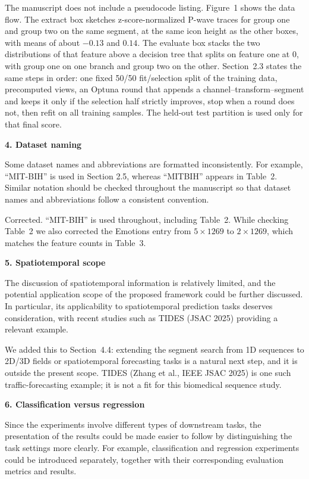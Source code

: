 \documentclass[11pt]{article}
\makeatletter
\newcommand{\rsp}{\par\vspace{0.9em}}
\newcommand{\rcitem}[2]{\begin{reviewerbox}\textbf{#1}\par\smallskip#2\end{reviewerbox}}
\newcommand{\response}[2]{%
  \begin{responsebox}#1%
  \def\@responseitems{#2}%
  \ifx\@responseitems\empty\else\begin{itemize}[nosep,leftmargin=1.2em]#2\end{itemize}\fi
  \end{responsebox}\rsp}
\makeatother
\begin{document}
\response{The manuscript does not include a pseudocode listing. Figure~1 shows the data
flow. The extract box sketches z-score-normalized P-wave traces for group one and group two on the same segment, at the same icon height as the other boxes, with means of about $-0.13$ and $0.14$.
The evaluate box stacks the two distributions of that feature above a decision tree that splits on feature one at $0$, with group one on one branch and group two on the other.
Section~2.3 states the same steps in order: one fixed 50/50 fit/selection split of the training data, precomputed views, an Optuna round that appends a
channel--transform--segment and keeps it only if the selection half strictly improves, stop when a
round does not, then refit on all training samples. The held-out test partition is used only for
that final score.}{}

\rcitem{4. Dataset naming}{Some dataset names and abbreviations are formatted inconsistently. For
example, ``MIT-BIH'' is used in Section 2.5, whereas ``MITBIH'' appears in Table~2. Similar notation
should be checked throughout the manuscript so that dataset names and abbreviations follow a consistent
convention.}

\response{Corrected. ``MIT-BIH'' is used throughout, including Table~2. While checking Table~2 we
also corrected the Emotions entry from $5\times1269$ to $2\times1269$, which matches the feature
counts in Table~3.}{}

\rcitem{5. Spatiotemporal scope}{The discussion of spatiotemporal information is relatively limited,
and the potential application scope of the proposed framework could be further discussed. In
particular, its applicability to spatiotemporal prediction tasks deserves consideration, with recent
studies such as TIDES (JSAC 2025) providing a relevant example.}

\response{We added this to Section~4.4: extending the segment search from 1D sequences to 2D/3D
fields or spatiotemporal forecasting tasks is a natural next step, and it is outside the present
scope. TIDES (Zhang et al., IEEE JSAC 2025) is one such traffic-forecasting example; it is not
a fit for this biomedical sequence study.}{}

\rcitem{6. Classification versus regression}{Since the experiments involve different types of
downstream tasks, the presentation of the results could be made easier to follow by distinguishing the
task settings more clearly. For example, classification and regression experiments could be
introduced separately, together with their corresponding evaluation metrics and results.}
\end{document}
